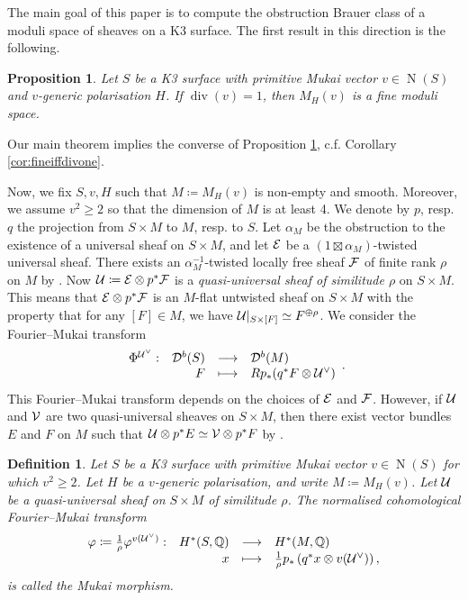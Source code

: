 \documentclass[11pt,twoside]{amsart}
\numberwithin{equation}{section}
\newtheorem{definition}[dummy]{Definition}
\newtheorem{proposition}[dummy]{Proposition}
\theoremstyle{definition}
\theoremstyle{plain}
\def\Db{\calD^{b}}
\def\N{\operatorname{N}}
\def\dv{\operatorname{div}}
\begin{document}
The main goal of this paper is to compute the obstruction Brauer class of a moduli space of sheaves on a K3 surface. 
The first result in this direction is the following.

\begin{proposition}\cite[Theorem 4.6.5]{HL10} \label{prop:fineifdivone}
    Let $S$ be a K3 surface with primitive Mukai vector $v\in \N(S)$ and $v$-generic polarisation $H$. If $\dv(v) = 1$, then $M_H(v)$ is a fine moduli space.
\end{proposition}
Our main theorem implies the converse of Proposition \ref{prop:fineifdivone}, c.f. Corollary \ref{cor:fineiffdivone}.

Now, we fix $S,v,H$ such that $M\coloneqq M_H(v)$ is non-empty and smooth. Moreover, we assume $v^2\geq 2$ so that the dimension of $M$ is at least 4. We denote by $p$, resp. $q$ the projection from $S\times M$ to $M$, resp. to $S$. Let $\alpha_M$ be the obstruction to the existence of a universal sheaf on $S\times M$, and let  $\mathcal{E}$ be a $(1\boxtimes \alpha_M)$-twisted universal sheaf. There exists an $\alpha_M^{-1}$-twisted locally free sheaf $\mathcal{F}$ of finite rank $\rho$ on $M$ by \cite[Theorem 1.3.5]{Cal00}. Now $\mathcal{U}\coloneqq \mathcal{E}\otimes p^*\mathcal{F}$ is a \textit{quasi-universal sheaf of similitude $\rho$} on $S\times M$. This means that $\mathcal{E}\otimes p^*\mathcal{F}$ is an $M$-flat untwisted sheaf on $S\times M$ with the property that 
for any $[F]\in M$, we have $\mathcal{U}|_{S\times[F]}\simeq F^{\oplus \rho}$.  We consider the Fourier--Mukai transform
$$\fonction{\Phi^{\calU^\vee}}{\Db(S)}{\Db(M)}{F}{Rp_*(q^*F\otimes \calU^\vee)}.$$
This Fourier--Mukai transform depends on the choices of $\mathcal{E}$ and $\mathcal{F}$. However, if $\mathcal{U}$ and $\mathcal{V}$ are two quasi-universal sheaves on $S\times M$, then there exist vector bundles $E$ and $F$ on $M$ such that $\mathcal{U}\otimes p^*E\simeq \mathcal{V}\otimes p^*F$ by \cite[Appendix 2]{Muk87}. 

\begin{definition}\label{def:mukaimorphism}
    Let $S$ be a K3 surface with primitive Mukai vector $v\in \N(S)$ for which $v^2\geq 2$. Let $H$ be a $v$-generic polarisation, and write $M\coloneqq M_H(v)$. Let $\mathcal{U}$ be a quasi-universal sheaf on $S\times M$ of similitude $\rho$. The normalised cohomological Fourier--Mukai transform
    $$\begin{array}{lrcl} \varphi\coloneqq \frac{1}{\rho}\varphi^{v(\mathcal{U}^\vee)}: & H^*(S,\mathbb{Q}) & \longrightarrow & H^*(M,\mathbb{Q}) \\ & x & \longmapsto & \frac{1}{\rho}p_*\left(q^*x\otimes v(\mathcal{U}^\vee)\right), \end{array}$$
    is called the \textit{Mukai morphism}.
\end{definition}
\end{document}
